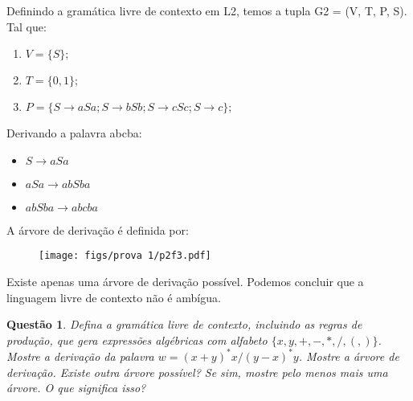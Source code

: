 \documentclass{article}
\newtheorem{problem}{Questão}
\begin{document}
    \begin{solution}
        Definindo a gramática livre de contexto em L2, temos a tupla G2 = (V, T, P, S). Tal que:
        
        \begin{enumerate}[label=]
            \item $V = \{S\};$
            \item $T = \{0, 1\};$
            \item $P = \{S \rightarrow aSa; S \rightarrow  bSb; S \rightarrow  cSc; S \rightarrow c\};$
        \end{enumerate}
        
        Derivando a palavra abcba:
        \begin{itemize}
            \item $S \rightarrow aSa$
            \item $aSa \rightarrow abSba$
            \item $abSba \rightarrow abcba$
        \end{itemize}
        
        A árvore de derivação é definida por: 
        \begin{figure}[H]
             \centering
             \texttt{[image: figs/prova 1/p2f3.pdf]}
        \end{figure}
        
        Existe apenas uma árvore de derivação possível. Podemos concluir que a linguagem livre de contexto não é ambígua.
        
        
    \end{solution}
    
    \begin{problem}
        Defina a gramática livre de contexto, incluindo as regras de produção, que gera expressões algébricas com alfabeto $\{x,y,+,-,*,/,(,)\}$. Mostre a derivação da palavra $w = (x+y)^*x / (y-x)^*y$. Mostre a árvore de derivação. Existe outra árvore possível? Se sim, mostre pelo menos mais
        uma árvore. O que significa isso?
    \end{problem}
    
\end{document}
